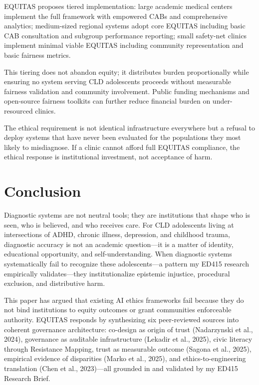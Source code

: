 \documentclass[12pt,a4paper]{article}
\begin{document}
EQUITAS proposes tiered implementation: large academic medical centers implement the full framework with empowered CABs and comprehensive analytics; medium-sized regional systems adopt core EQUITAS including basic CAB consultation and subgroup performance reporting; small safety-net clinics implement minimal viable EQUITAS including community representation and basic fairness metrics.\cite{lekadir2025}

This tiering does not abandon equity; it distributes burden proportionally while ensuring no system serving CLD adolescents proceeds without measurable fairness validation and community involvement.\cite{lekadir2025} Public funding mechanisms and open-source fairness toolkits can further reduce financial burden on under-resourced clinics.\cite{chen2023}

The ethical requirement is not identical infrastructure everywhere but a refusal to deploy systems that have never been evaluated for the populations they most likely to misdiagnose. If a clinic cannot afford full EQUITAS compliance, the ethical response is institutional investment, not acceptance of harm.\cite{garcia_ed415}

\section{Conclusion}

Diagnostic systems are not neutral tools; they are institutions that shape who is seen, who is believed, and who receives care. For CLD adolescents living at intersections of ADHD, chronic illness, depression, and childhood trauma, diagnostic accuracy is not an academic question—it is a matter of identity, educational opportunity, and self-understanding. When diagnostic systems systematically fail to recognize these adolescents—a pattern my ED415 research empirically validates—they institutionalize epistemic injustice, procedural exclusion, and distributive harm.\cite{garcia_ed415}

This paper has argued that existing AI ethics frameworks fail because they do not bind institutions to equity outcomes or grant communities enforceable authority. EQUITAS responds by synthesizing six peer-reviewed sources into coherent governance architecture: co-design as origin of trust (Nadarzynski et al., 2024), governance as auditable infrastructure (Lekadir et al., 2025), civic literacy through Resistance Mapping, trust as measurable outcome (Sagona et al., 2025), empirical evidence of disparities (Marko et al., 2025), and ethics-to-engineering translation (Chen et al., 2023)—all grounded in and validated by my ED415 Research Brief.\cite{nadarzynski2024}\cite{lekadir2025}\cite{sagona2025}\cite{marko2025}\cite{chen2023}\cite{garcia_ed415}
\end{document}
